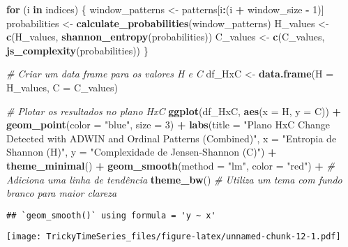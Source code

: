 \documentclass[
]{article}
\newenvironment{Shaded}{\begin{snugshade}}{\end{snugshade}}
\newcommand{\AttributeTok}[1]{\textcolor[rgb]{0.13,0.29,0.53}{#1}}
\newcommand{\CommentTok}[1]{\textcolor[rgb]{0.56,0.35,0.01}{\textit{#1}}}
\newcommand{\ControlFlowTok}[1]{\textcolor[rgb]{0.13,0.29,0.53}{\textbf{#1}}}
\newcommand{\DecValTok}[1]{\textcolor[rgb]{0.00,0.00,0.81}{#1}}
\newcommand{\FunctionTok}[1]{\textcolor[rgb]{0.13,0.29,0.53}{\textbf{#1}}}
\newcommand{\NormalTok}[1]{#1}
\newcommand{\OtherTok}[1]{\textcolor[rgb]{0.56,0.35,0.01}{#1}}
\newcommand{\SpecialCharTok}[1]{\textcolor[rgb]{0.81,0.36,0.00}{\textbf{#1}}}
\newcommand{\StringTok}[1]{\textcolor[rgb]{0.31,0.60,0.02}{#1}}
\begin{document}
\begin{Shaded}
\begin{Highlighting}[]
\ControlFlowTok{for}\NormalTok{ (i }\ControlFlowTok{in}\NormalTok{ indices) \{}
\NormalTok{  window\_patterns }\OtherTok{\textless{}{-}}\NormalTok{ patterns[i}\SpecialCharTok{:}\NormalTok{(i }\SpecialCharTok{+}\NormalTok{ window\_size }\SpecialCharTok{{-}} \DecValTok{1}\NormalTok{)]}
\NormalTok{  probabilities }\OtherTok{\textless{}{-}} \FunctionTok{calculate\_probabilities}\NormalTok{(window\_patterns)}
\NormalTok{  H\_values }\OtherTok{\textless{}{-}} \FunctionTok{c}\NormalTok{(H\_values, }\FunctionTok{shannon\_entropy}\NormalTok{(probabilities))}
\NormalTok{  C\_values }\OtherTok{\textless{}{-}} \FunctionTok{c}\NormalTok{(C\_values, }\FunctionTok{js\_complexity}\NormalTok{(probabilities))}
\NormalTok{\}}

\CommentTok{\# Criar um data frame para os valores H e C}
\NormalTok{df\_HxC }\OtherTok{\textless{}{-}} \FunctionTok{data.frame}\NormalTok{(}\AttributeTok{H =}\NormalTok{ H\_values, }\AttributeTok{C =}\NormalTok{ C\_values)}

\CommentTok{\# Plotar os resultados no plano HxC}
\FunctionTok{ggplot}\NormalTok{(df\_HxC, }\FunctionTok{aes}\NormalTok{(}\AttributeTok{x =}\NormalTok{ H, }\AttributeTok{y =}\NormalTok{ C)) }\SpecialCharTok{+}
  \FunctionTok{geom\_point}\NormalTok{(}\AttributeTok{color =} \StringTok{"blue"}\NormalTok{, }\AttributeTok{size =} \DecValTok{3}\NormalTok{) }\SpecialCharTok{+}
  \FunctionTok{labs}\NormalTok{(}\AttributeTok{title =} \StringTok{"Plano HxC Change Detected with ADWIN and Ordinal Patterns (Combined)"}\NormalTok{,}
       \AttributeTok{x =} \StringTok{"Entropia de Shannon (H)"}\NormalTok{,}
       \AttributeTok{y =} \StringTok{"Complexidade de Jensen{-}Shannon (C)"}\NormalTok{) }\SpecialCharTok{+}
  \FunctionTok{theme\_minimal}\NormalTok{() }\SpecialCharTok{+}
  \FunctionTok{geom\_smooth}\NormalTok{(}\AttributeTok{method =} \StringTok{"lm"}\NormalTok{, }\AttributeTok{color =} \StringTok{"red"}\NormalTok{) }\SpecialCharTok{+} \CommentTok{\# Adiciona uma linha de tendência}
  \FunctionTok{theme\_bw}\NormalTok{() }\CommentTok{\# Utiliza um tema com fundo branco para maior clareza}
\end{Highlighting}
\end{Shaded}

\begin{verbatim}
## `geom_smooth()` using formula = 'y ~ x'
\end{verbatim}

\texttt{[image: TrickyTimeSeries\_files/figure-latex/unnamed-chunk-12-1.pdf]}
\end{document}
